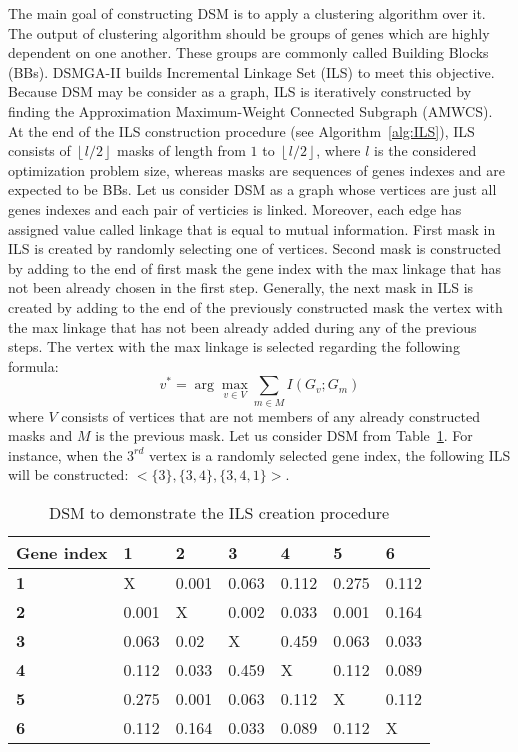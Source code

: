 The main goal of constructing DSM is to apply a clustering algorithm over it. The output of clustering algorithm should be groups of genes which are highly dependent on one another. These groups are commonly called Building Blocks (BBs). DSMGA-II builds Incremental Linkage Set (ILS) to meet this objective. Because DSM may be consider as a graph, ILS is iteratively constructed by finding the Approximation Maximum-Weight Connected Subgraph (AMWCS). At the end of the ILS construction procedure (see Algorithm~\ref{alg:ILS}), ILS consists of $\left \lfloor{l/2}\right \rfloor$ masks of length from $1$ to $\left \lfloor{l/2}\right \rfloor$, where $l$ is the considered optimization problem size, whereas masks are sequences of genes indexes and are expected to be BBs. Let us consider DSM as a graph whose vertices are just all genes indexes and each pair of verticies is linked. Moreover, each edge has assigned value called linkage that is equal to mutual information. First mask in ILS is created by randomly selecting one of vertices. Second mask is constructed by adding to the end of first mask the gene index with the max linkage that has not been already chosen in the first step. Generally, the next mask in ILS is created by adding to the end of the previously constructed mask the vertex with the max linkage that has not been already added during any of the previous steps. The vertex with the max linkage is selected regarding the following formula:
\begin{equation}
\label{eq:maxLinkage}
	v^* = \arg \max_{v \in V} \sum_{m \in M} I(G_v; G_m)
\end{equation}
where $V$ consists of vertices that are not members of any already constructed masks and $M$ is the previous mask. Let us consider DSM from Table~\ref{tab:DSM}. For instance, when the $3^{rd}$ vertex is a randomly selected gene index, the following ILS will be constructed: $<$$\{3\}, \{3, 4\}, \{3, 4, 1\}$$>$.
\begin{table}
	\caption{DSM to demonstrate the ILS creation procedure}
	\label{tab:DSM}
	\begin{tabular}{lllllll}
		\toprule
		\textbf{Gene index} & \textbf{1} & \textbf{2} & \textbf{3} & \textbf{4} & \textbf{5} & \textbf{6} \\
		\midrule
		\textbf{1} & X & 0.001 & 0.063 & 0.112 & 0.275 & 0.112 \\
		\textbf{2} & 0.001 & X & 0.002 & 0.033 & 0.001 & 0.164 \\
		\textbf{3} & 0.063 & 0.02 & X & 0.459 & 0.063 & 0.033 \\
		\textbf{4} & 0.112 & 0.033 & 0.459 & X & 0.112 & 0.089 \\
		\textbf{5} & 0.275 & 0.001 & 0.063 & 0.112 & X & 0.112 \\
		\textbf{6} & 0.112 & 0.164 & 0.033 & 0.089 & 0.112 & X \\
		\bottomrule
	\end{tabular}
\end{table} 

